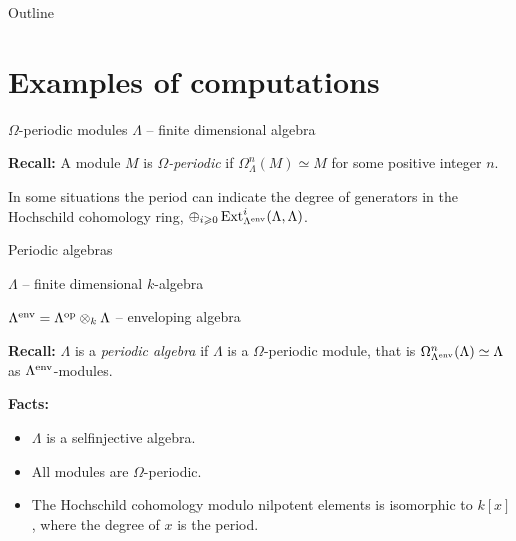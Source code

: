 \begin{frame}
  \titlepage
\end{frame}

\begin{frame}{Outline}
  \tableofcontents
\end{frame}

\section{Examples of computations}

\begin{frame}[fragile]{$\Omega$-periodic modules}
$\Lambda$ -- finite dimensional algebra\medskip

\textbf{Recall:} A module $M$ is \emph{$\Omega$-periodic} if
$\Omega^n_\Lambda(M)\simeq M$ for some positive integer $n$.\medskip 

In some situations the period can indicate the degree of generators in
the Hochschild cohomology ring, $\oplus_{i\geqslant
  0}\operatorname{Ext}\nolimits^i_{\Lambda^{\operatorname{env}\nolimits}}(\Lambda, \Lambda)$. 
\end{frame}

\begin{frame}[fragile]{Periodic algebras}

$\Lambda$ -- finite dimensional $k$-algebra\medskip

$\Lambda^{\operatorname{env}\nolimits} = \Lambda^{\operatorname{op}\nolimits}\otimes_k \Lambda$ -- enveloping
algebra\medskip

\textbf{Recall:} $\Lambda$ is a \emph{periodic algebra} if $\Lambda$ is a
$\Omega$-periodic module, that is $\Omega^n_{\Lambda^{\operatorname{env}\nolimits}}(\Lambda)
\simeq \Lambda$ as $\Lambda^{\operatorname{env}\nolimits}$-modules.\medskip

\textbf{Facts:}
\begin{itemize}
\item $\Lambda$ is a selfinjective algebra.
\item All modules are $\Omega$-periodic.
\item The Hochschild cohomology modulo nilpotent elements is
  isomorphic to $k[x]$, where the degree of $x$ is the period.
\end{itemize}
\end{frame}

